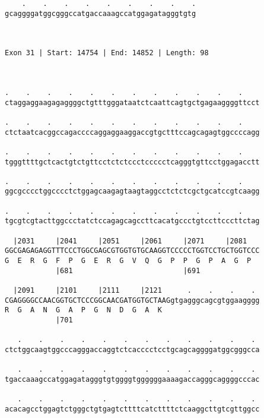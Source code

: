 \documentclass{article}
\begin{document}
\begin{Verbatim}
    .    .    .    .    .    .    .    .    .
gcaggggatggcgggccatgaccaaagccatggagatagggtgtg
                                             
                                             
 
Exon 31 | Start: 14754 | End: 14852 | Length: 98



.    .    .    .    .    .    .    .    .    .    .    .    
ctaggaggaagagaggggctgtttgggataatctcaattcagtgctgagaaggggttcct
                                                            
.    .    .    .    .    .    .    .    .    .    .    .    
ctctaatcacggccagaccccaggaggaaggaccgtgctttccagcagagtggccccagg
                                                            
.    .    .    .    .    .    .    .    .    .    .    .    
tgggttttgctcactgtctgttcctctctccctccccctcagggtgttcctggagacctt
                                                            
.    .    .    .    .    .    .    .    .    .    .    .    
ggcgcccctggcccctctggagcaagagtaagtaggcctctctcgctgcatccgtcaagg
                                                            
.    .    .    .    .    .    .    .    .    .    .    .    
tgcgtcgtacttggccctatctccagagcagccttcacatgccctgtccttcccttctag
                                                            
  |2031     |2041     |2051     |2061     |2071     |2081   
GGCGAGAGAGGTTTCCCTGGCGAGCGTGGTGTGCAAGGTCCCCCTGGTCCTGCTGGTCCC
G  E  R  G  F  P  G  E  R  G  V  Q  G  P  P  G  P  A  G  P  
            |681                          |691              
  
  |2091     |2101     |2111     |2121      .    .    .    . 
CGAGGGGCCAACGGTGCTCCCGGCAACGATGGTGCTAAGgtgagggcagcgtggaagggg
R  G  A  N  G  A  P  G  N  D  G  A  K                       
            |701                                            
  
   .    .    .    .    .    .    .    .    .    .    .    . 
ctctggcaagtggcccagggaccaggtctcacccctcctgcagcaggggatggcgggcca
                                                            
   .    .    .    .    .    .    .    .    .    .    .    . 
tgaccaaagccatggagatagggtgtggggtggggggaaaagaccagggcaggggcccac
                                                            
   .    .    .    .    .    .    .    .    .    .    .    . 
acacagcctggagtctgggctgtgagtcttttcatcttttctcaaggcttgtcgttggcc
                                                            

\end{Verbatim}
\end{document}
